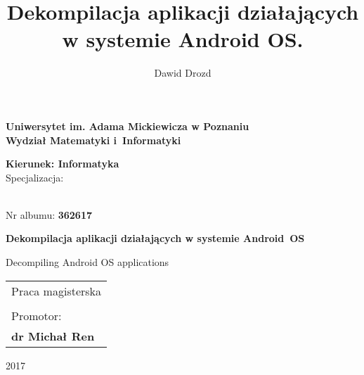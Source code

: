 \documentclass[12pt,a4paper,leqno,oneside,titlepage]{book}
\author{Dawid Drozd}
\title{Dekompilacja aplikacji działających w systemie Android OS.}
\begin{document}
\begin{titlepage}
\let\footnotesize\small
\let\footnoterule\relax
\let \footnote \thanks

\begin{center}
{\large \bf Uniwersytet im. Adama Mickiewicza w Poznaniu \\ Wydział Matematyki i~Informatyki \par}
\vspace{0.5cm plus 1mm minus 2mm}
{{\bf Kierunek: Informatyka} \\ \small Specjalizacja:\par}
\end{center}%

\vspace{1.5cm plus 1fill}
\begin{flushleft}
{ \\ \normalsize Nr albumu: \bf 362617\par}
\end{flushleft}
\vspace{1.5cm plus 1mm minus 2mm}

\begin{center}
{\huge\textbf{Dekompilacja aplikacji działających w systemie Android~OS}\par}
\vspace{0.5cm plus 1mm minus 2mm}
{\large Decompiling Android OS applications}
\par
\vspace{1.5cm plus 1.5fill}

\begin{flushright}\large
\begin{tabular}{l}
Praca magisterska\\[3pt]
\MakeUppercase{ }\\[3pt]
Promotor: \\[3pt]
\bfseries dr Michał Ren \\[3pt]
\end{tabular}
\end{flushright}
\vspace{4cm plus .1fill}
{\large 2017\par}
\end{center}
\end{titlepage}

\end{document}
